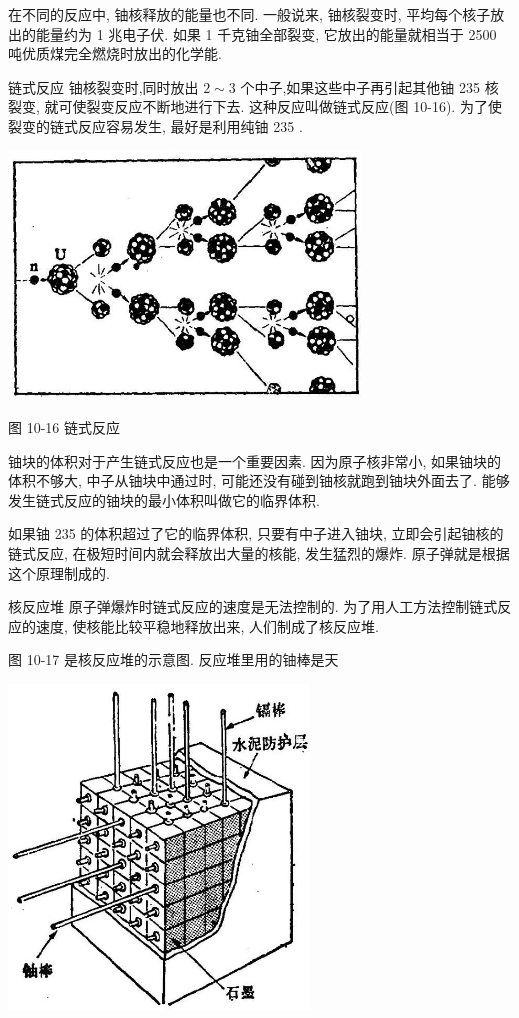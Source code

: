 \documentclass[10pt]{article}
\begin{document}
在不同的反应中, 铀核释放的能量也不同. 一般说来, 铀核裂变时, 平均每个核子放出的能量约为 1 兆电子伏. 如果 1 千克铀全部裂变, 它放出的能量就相当于 2500 吨优质煤完全燃烧时放出的化学能.

链式反应 铀核裂变时,同时放出 \(2 \sim 3\) 个中子,如果这些中子再引起其他铀 235 核裂变, 就可使裂变反应不断地进行下去. 这种反应叫做链式反应(图 10-16). 为了使裂变的链式反应容易发生, 最好是利用纯铀 235 .

\begin{center}
\includegraphics[max width=0.7\textwidth]{images/01913056-1f15-74d8-9184-9aab52c9d66b_359_738753.jpg}
\end{center}

图 10-16 链式反应

铀块的体积对于产生链式反应也是一个重要因素. 因为原子核非常小, 如果铀块的体积不够大, 中子从铀块中通过时, 可能还没有碰到铀核就跑到铀块外面去了. 能够发生链式反应的铀块的最小体积叫做它的临界体积.

如果铀 235 的体积超过了它的临界体积, 只要有中子进入铀块, 立即会引起铀核的链式反应, 在极短时间内就会释放出大量的核能, 发生猛烈的爆炸. 原子弹就是根据这个原理制成的.

核反应堆 原子弹爆炸时链式反应的速度是无法控制的. 为了用人工方法控制链式反应的速度, 使核能比较平稳地释放出来, 人们制成了核反应堆.

图 10-17 是核反应堆的示意图. 反应堆里用的铀棒是天

\begin{center}
\includegraphics[max width=0.6\textwidth]{images/01913056-1f15-74d8-9184-9aab52c9d66b_360_780977.jpg}
\end{center}
\end{document}
